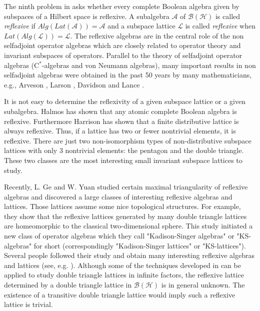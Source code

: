 \documentclass{jaums}
\theoremstyle{thmit} %
\theoremstyle{thmrm} %
\begin{document}
The ninth problem in {\cite{[Hal]}} asks whether every complete Boolean algebra
given by subspaces of a Hilbert space is reflexive. A subalgebra $\mathcal{A}$
of $\mathcal{B}(\mathcal{H})$
is called {\sl reflexive} if $Alg(Lat(\mathcal{A}))=\mathcal{A}$ and a subspace
lattice $\mathcal{L}$ is called {\sl reflexive} when
$Lat(Alg(\mathcal{L}))=\mathcal{L}$.
The reflexive algebras are in the central role of the non selfadjoint operator
algebras which are closely related to operator theory
and invariant subspaces of operators. Parallel to the theory of selfadjoint
operator algebras (C$^*$-algebras and von Neumann algebras), many important
results in non selfadjoint algebras were obtained in the past 50 years by many
mathematicians, e.g.,
Arveson {\cite{[Ar]}}, Larson {\cite{[La]}}, Davidson {\cite{[Da]}} and Lance
{\cite{[Lan]}}.

It is not easy to determine the reflexivity of a given subspace lattice or a
given subalgebra. Halmos {\cite{[Ha2]}} has shown that any atomic complete
Boolean algebra is reflexive.
Furthermore Harrison {\cite{[Har]}} has shown that a finite distributive
lattice is always reflexive.
Thus, if a lattice has two or fewer nontrivial elements, it is reflexive.
There are just two non-isomorphism types of
non-distributive subspace lattices with only 3 nontrivial elements: the pentagon
and the double triangle.
These two classes are the most interesting small invariant subspace lattices to
study.



Recently, L. Ge and W. Yuan  {\cite{[GY],[GY2]}} studied certain maximal
triangularity of reflexive algebras and discovered a large classes of
interesting reflexive algebras and lattices. Those lattices assume some nice
topological structures. For example, they show that the reflexive lattices
generated by many double triangle lattices are homeomorphic to the classical
two-dimensional sphere. This study initiated a new class of operator algebras
which they call "Kadison-Singer algebras" or "KS-algebras" for short
(correspondingly "Kadison-Singer lattices" or "KS-lattices"). Several people
followed their study and obtain many interesting reflexive algebras and lattices
(see, e.g. {\cite{[HY], [WY], [DH]} }). Although some of the techniques
developed in {\cite{[GY],[GY2]}} can be applied to study double triangle
lattices in infinite factors, the reflexive lattice determined by a double
triangle lattice in $\mathcal{B}(\mathcal{H})$ is in general unknown. The
existence of a transitive double triangle 
lattice would imply such a reflexive lattice is trivial.
\end{document}
